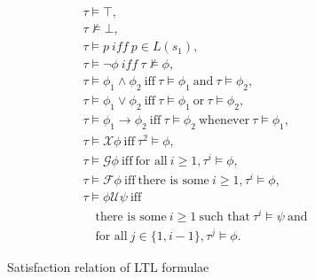 \documentclass{llncs}%
\begin{document}
\begin{figure}
$$\begin{array}{l}
\tau \models \top, \\
\tau \not\models \bot, \\
\tau \models p ~\mathit{iff}~ p \in L(s_1), \\
\tau \models \neg\phi ~\mathit{iff}~ \tau \not\models \phi, \\
\tau \models \phi_1 \land \phi_2 ~\mbox{iff}~ \tau \models \phi_1 ~\mbox{and}~ \tau \models \phi_2, \\
\tau \models \phi_1 \lor \phi_2 ~\mbox{iff}~ \tau \models \phi_1 ~\mbox{or}~ \tau \models \phi_2, \\
\tau \models \phi_1 \to \phi_2 ~\mbox{iff}~ \tau \models \phi_2 ~\mbox{whenever}~ \tau \models \phi_1, \\
\tau \models \mathcal{X} \phi ~\mbox{iff}~ \tau^2 \models \phi, \\
\tau \models \mathcal{G} \phi ~\mbox{iff}~ \mbox{for all}~ i \ge 1, \tau^i \models \phi, \\
\tau \models \mathcal{F} \phi ~\mbox{iff}~ \mbox{there is some}~ i \ge 1, \tau^i \models \phi, \\
\tau \models \phi \mathcal{U} \psi ~\mbox{iff}~ \\
\quad \mbox{there is some}~ i \ge 1 ~\mbox{such that}~ \tau^i \models \psi ~\mbox{and} \\ 
\quad \mbox{for all}~ j \in \{1, i-1\}, \tau^j \models \phi. 
\end{array}$$
\caption{Satisfaction relation of LTL formulae}\label{fig:ltl-sat}
\end{figure}
\end{document}
